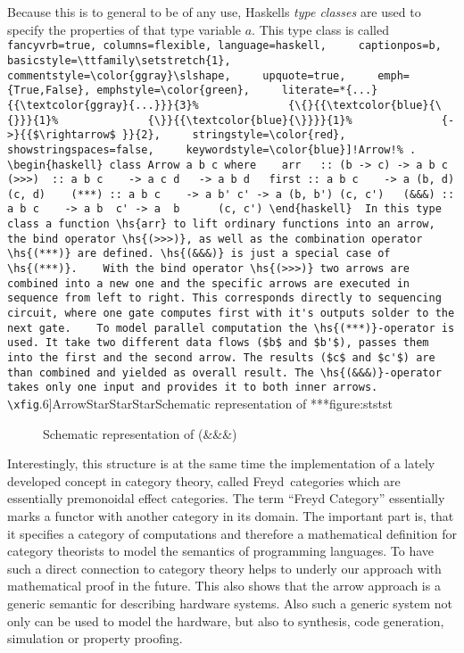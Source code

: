 \documentclass[11pt,final,a4paper]{article}
\newcommand{\hs}[1]{%
  \lstinline[
    fancyvrb=true, columns=flexible, language=haskell,
    captionpos=b,
    basicstyle=\ttfamily\setstretch{1},
    commentstyle=\color{ggray}\slshape,
    upquote=true,
    emph={True,False}, emphstyle=\color{green},
    literate=*{...}{{\textcolor{ggray}{...}}}{3}%
             {\{}{{\textcolor{blue}{\{}}}{1}%
             {\}}{{\textcolor{blue}{\}}}}{1}%
             {->}{{$\rightarrow$ }}{2},
    stringstyle=\color{red}, showstringspaces=false,
    keywordstyle=\color{blue}]!#1!%
}
\newcommand{\xfig}[4][0.9] {%
    \begin{figure}[ht]
        \begin{center}
            \graphicspath{{./}{Images/}}
            \scalebox{#1}{%
                
            }
            \caption{\label{#4} #3}
        \end{center}
    \end{figure}
}
\begin{document}
Because this is to general to be of any use, Haskells \emph{type classes} are used to specify the properties of that type variable $a$. This
type class is called \hs{Arrow}. 

\begin{haskell}
class Arrow a b c where 
  arr   :: (b -> c) -> a b c
  (>>>)  :: a b c    -> a c d   -> a b d
  first :: a b c    -> a (b, d) (c, d) 
  (***) :: a b c    -> a b' c' -> a (b, b') (c, c')
  (&&&) :: a b c    -> a b  c' -> a  b      (c, c')
\end{haskell}

In this type class a function \hs{arr} to lift ordinary functions into an arrow, the bind operator \hs{(>>>)}, as well as the combination
operator \hs{(***)} are defined. \hs{(&&&)} is just a special case of \hs{(***)}. 


With the bind operator \hs{(>>>)} two arrows are combined into a new one and the specific arrows are executed in sequence from left to
right. This corresponds directly to sequencing circuit, where one gate computes first with it's outputs solder to the next gate. 
 
To model parallel computation the \hs{(***)}-operator is used. It take two different data flows ($b$ and $b'$), passes them into the first
and the second arrow. The results ($c$ and $c'$) are than combined and yielded as overall result. The \hs{(&&&)}-operator takes only one
input and provides it to both inner arrows.

\xfig[.6]{ArrowStarStarStar}{Schematic representation of ***}{figure:ststst}
\xfig[.6]{ArrowAndAndAnd}{Schematic representation of (\&\&\&)}{figure:ananan}


Interestingly, this structure is at the same time the implementation of a lately developed concept in category theory, called Freyd~categories 
which are essentially premonoidal effect categories\cite{Heunen06arrows, Hughes98generalisingmonads,PatersonRA}. The term "`Freyd
Category"' essentially marks a functor with another category in its domain. The important part is, that it specifies a category of
computations and therefore a mathematical definition for category theorists to model the semantics of programming languages. To have such a
direct connection to category theory helps to underly our approach with mathematical proof in the future. This also shows that the arrow
approach is a generic semantic for describing hardware systems. Also such a generic system not only can be used to model the hardware, but
also to synthesis, code generation, simulation or property proofing. 
\end{document}
